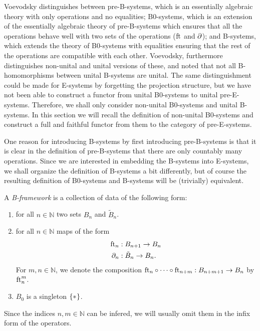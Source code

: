 Voevodsky distinguishes between pre-B-systems, which is an essentially algebraic theory with
only operations and no equalities; B0-systems, which is an extension of the
essentially algebraic theory of pre-B-systems which ensures that all the operations behave
well with two sets of the operations ($\eft$ and $\ebd$); and B-systems, which extends the 
theory of B0-systems with equalities ensuring that the rest of the operations 
are compatible with each other. Voevodsky, furthermore distinguishes
non-unital and unital versions of these, and noted that not all B-homomorphisms
between unital B-systems are unital. The same distinguishment could be made for 
E-systems by forgetting the projection structure, but we have not been able to construct a
functor from unital B0-systems to unital pre-E-systems. Therefore, we shall only
consider non-unital B0-systems and unital B-systems. In this section we will
recall the definition of non-unital B0-systems and construct a full and faithful
functor from them to the category of pre-E-systems. 

One reason for introducing B-systems by first introducing pre-B-systems is that
it is clear in the definition of pre-B-systems that there are only countably
many operations. Since we are interested in embedding the B-systems into E-systems,
we shall organize the definition of B-systems a bit differently, but of course
the resulting definition of B0-systems and B-systems will be (trivially) 
equivalent.

\begin{defn}
A \emph{B-framework} is a collection of data of the following form:
\begin{enumerate}
\item for all $n\in\mathbb{N}$ two sets $B_n$ and $\tilde{B}_n$. 
\item for all $n\in\mathbb{N}$ maps of the form
\begin{align*}
\eft[n] & : B_{n+1}\to B_n \\
\ebd[n] & : \tilde{B}_n\to B_n.
\end{align*}
For $m,n\in\mathbb{N}$, we denote the composition $\eft[n]\circ\cdots\circ\eft[n+m]:B_{n+m+1}\to B_n$ by $\eft[n]^m$. 
\item $B_0$ is a singleton $\{\pt\}$.
\end{enumerate} 
\end{defn}

\begin{rmk}
Since the indices $n,m\in\mathbb{N}$ can be infered, we will usually omit them
in the infix form of the operators.
\end{rmk}

